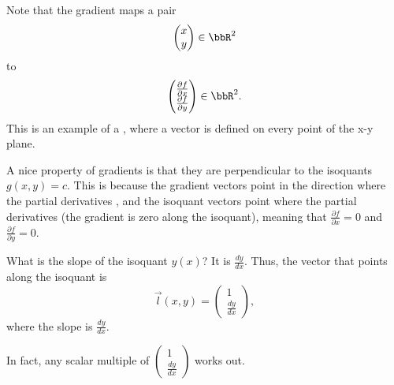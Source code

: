 \documentclass[a4paper, 12pt,oneside,openany]{book}
\begin{document}

Note that the gradient maps a pair $$\begin{pmatrix} x \\ y \end{pmatrix} \in \bbR^2$$ to $$\begin{pmatrix} \frac{\partial f}{\partial x}\\ \frac{\partial f}{\partial y} \end{pmatrix} \in \bbR^2.$$ This is an example of a , where a vector is defined on every point of the x-y plane.

A nice property of gradients is that they are perpendicular to the isoquants $g(x, y)=c$. This is because the gradient vectors point in the direction where the partial derivatives , and the isoquant vectors point where the partial derivatives  (the gradient is zero along the isoquant), meaning that $\frac{\partial f}{\partial x} =0$ and $\frac{\partial f}{\partial y} =0$.

What is the slope of the isoquant $y(x)$? It is $\frac{dy}{dx}$. Thus, the vector that points along the isoquant is $$\vec{l}(x, y) =  \begin{pmatrix} 1 \\ \frac{dy}{dx} \end{pmatrix},$$ where the slope is $\frac{dy}{dx}$.

In fact, any scalar multiple of $\begin{pmatrix} 1 \\ \frac{dy}{dx} \end{pmatrix}$ works out.
\end{document}

